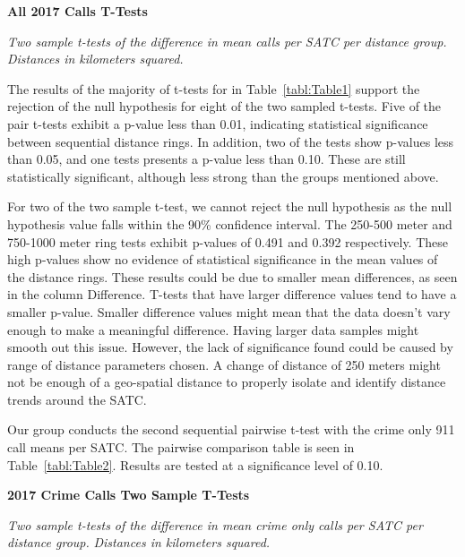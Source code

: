 \documentclass[12pt]{article}
\begin{document}
\begin{table}[htbp]
\begin{center}

\end{center}

\caption{\textbf{All 2017 Calls T-Tests}}
\label{tabl:Table1}
\centering\textit{Two sample t-tests of the difference in mean calls per SATC per distance group.}
\textit{Distances in kilometers squared.}
\end{table}


The results of the majority of t-tests for in Table~\ref{tabl:Table1} support the rejection of the null hypothesis for eight of the two sampled t-tests. Five of the pair t-tests exhibit a p-value less than 0.01, indicating statistical significance between sequential distance rings. In addition, two of the tests show p-values less than 0.05, and one tests presents a p-value less than 0.10. These are still statistically significant, although less strong than the groups mentioned above. 

For two of the two sample t-test, we cannot reject the null hypothesis as the null hypothesis value falls within the 90\% confidence interval. The 250-500 meter and 750-1000 meter ring tests exhibit p-values of 0.491 and 0.392 respectively. These high p-values show no evidence of statistical significance in the mean values of the distance rings. These results could be due to smaller mean differences, as seen in the column Difference. T-tests that have larger difference values tend to have a smaller p-value. Smaller difference values might mean that the data doesn't vary enough to make a meaningful difference. Having larger data samples might smooth out this issue. However, the lack of significance found could be caused by range of distance parameters chosen. A change of distance of 250 meters might not be enough of a geo-spatial distance to properly isolate and identify distance trends around the SATC.

Our group conducts the second sequential pairwise t-test with the crime only 911 call means per SATC. The pairwise comparison table is seen in Table~\ref{tabl:Table2}. Results are tested at a significance level of 0.10. 


\begin{table}[hb!]
\begin{center}

\end{center}


\caption{\bf{2017 Crime Calls Two Sample T-Tests}}
\label{tabl:Table2}
\centering\textit{Two sample t-tests of the difference in mean crime only calls per SATC per distance group.}
\textit{Distances in kilometers squared.}
\end{table}
\end{document}
